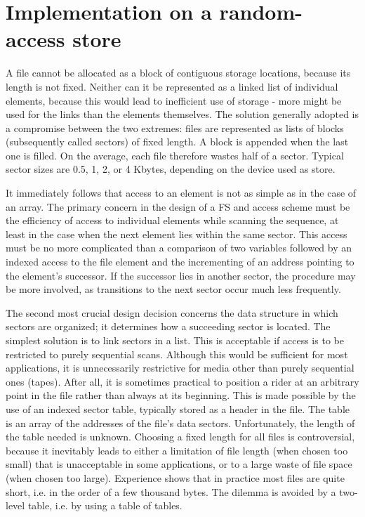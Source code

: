 \section{Implementation on a random-access store}
A file cannot be allocated as a block of contiguous storage locations, because its length is not
fixed. Neither can it be represented as a linked list of individual elements, because this would
lead to inefficient use of storage - more might be used for the links than the elements themselves.
The solution generally adopted is a compromise between the two extremes: files are represented
as lists of blocks (subsequently called sectors) of fixed length. A block is appended when the last
one is filled. On the average, each file therefore wastes half of a sector. Typical sector sizes are
0.5, 1, 2, or 4 Kbytes, depending on the device used as store.

It immediately follows that access to an element is not as simple as in the case of an array. The
primary concern in the design of a FS and access scheme must be the efficiency of
access to individual elements while scanning the sequence, at least in the case when the next
element lies within the same sector. This access must be no more complicated than a
comparison of two variables followed by an indexed access to the file element and the
incrementing of an address pointing to the element's successor. If the successor lies in another
sector, the procedure may be more involved, as transitions to the next sector occur much less
frequently.

The second most crucial design decision concerns the data structure in which sectors are
organized; it determines how a succeeding sector is located. The simplest solution is to link
sectors in a list. This is acceptable if access is to be restricted to purely sequential scans.
Although this would be sufficient for most applications, it is unnecessarily restrictive for media
other than purely sequential ones (tapes). After all, it is sometimes practical to position a rider at
an arbitrary point in the file rather than always at its beginning. This is made possible by the use
of an indexed sector table, typically stored as a header in the file. The table is an array of the
addresses of the file's data sectors. Unfortunately, the length of the table needed is unknown.
Choosing a fixed length for all files is controversial, because it inevitably leads to either a
limitation of file length (when chosen too small) that is unacceptable in some applications, or to a
large waste of file space (when chosen too large). Experience shows that in practice most files
are quite short, i.e. in the order of a few thousand bytes. The dilemma is avoided by a two-level
table, i.e. by using a table of tables.

